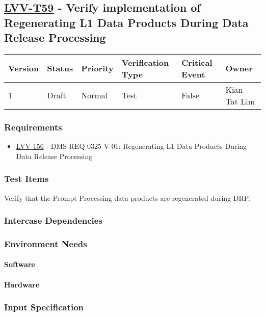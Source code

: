\subsection{\href{https://jira.lsstcorp.org/secure/Tests.jspa\#/testCase/LVV-T59}{LVV-T59}
    - Verify implementation of Regenerating L1 Data Products During Data Release Processing}\label{lvv-t59}

\begin{longtable}[]{llllll}
\toprule
Version & Status & Priority & Verification Type & Critical Event & Owner
\\\midrule
1 & Draft & Normal &
Test & False & Kian-Tat Lim
\\\bottomrule
\end{longtable}

\subsubsection{Requirements}
\begin{itemize}
\item \href{https://jira.lsstcorp.org/browse/LVV-156}{LVV-156} - DMS-REQ-0325-V-01: Regenerating L1 Data Products During Data Release Processing
\end{itemize}

\subsubsection{Test Items}
Verify that the Prompt Processing data products are regenerated during
DRP.



\subsubsection{Intercase Dependencies}

\subsubsection{Environment Needs}

\paragraph{Software}

\paragraph{Hardware}

\subsubsection{Input Specification}

